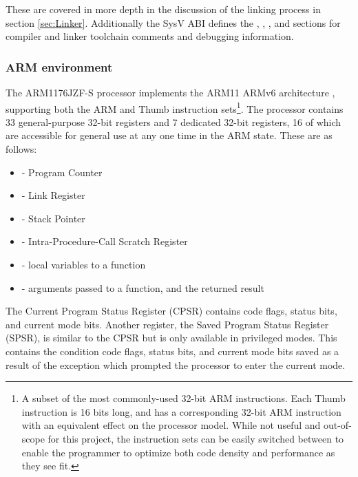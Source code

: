        These are covered in more depth in the discussion of the linking process
        in section \ref{sec:Linker}. Additionally the SysV ABI defines the
        , , , and 
        sections for compiler and linker toolchain comments and debugging
        information.

    \subsubsection{ARM environment}
       The ARM1176JZF-S processor implements the ARM11 ARMv6 architecture
       \cite{TRM}, supporting both the ARM and Thumb instruction sets\footnote{A
       subset of the most commonly-used 32-bit ARM instructions.  Each Thumb
       instruction is 16 bits long, and has a corresponding 32-bit ARM
       instruction with an equivalent effect on the processor model. While not
       useful and out-of-scope for this project, the instruction sets can be
       easily switched between to enable the programmer to optimize both code
       density and performance as they see fit.}. The processor contains 33
       general-purpose 32-bit registers and 7 dedicated 32-bit registers, 16 of
       which are accessible for general use at any one time in the ARM state.
       These are as follows:
       \begin{itemize}
           \itemsep0em
           \item {} - Program Counter
           \item {} - Link Register
           \item {} - Stack Pointer
           \item {} - Intra-Procedure-Call Scratch Register
           \item {} - local variables to a function
           \item {} - arguments passed to a function, and the returned
               result
       \end{itemize}

       The Current Program Status Register (CPSR) contains code flags, status
       bits, and current mode bits.  Another register, the Saved Program Status
       Register (SPSR), is similar to the CPSR but is only available in
       privileged modes. This contains the condition code flags, status bits,
       and current mode bits saved as a result of the exception which prompted
       the processor to enter the current mode.

